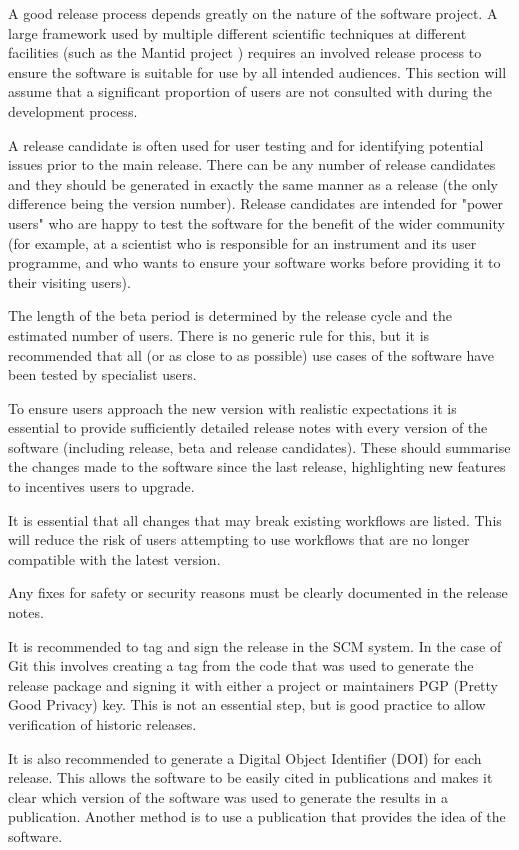 \documentclass[jnr]{iosart2x}
\begin{document}
\begin{itemzie}
A good release process depends greatly on the nature of the software project.
A large framework used by multiple different scientific techniques at different facilities (such as the Mantid project \cite{Manitd}) requires an involved release process to ensure the software is suitable for use by all intended audiences.
This section will assume that a significant proportion of users are not consulted with during the development process.

A release candidate is often used for user testing and for identifying potential issues prior to the main release.
There can be any number of release candidates and they should be generated in exactly the same manner as a release (the only difference being the version number).
Release candidates are intended for "power users" who are happy to test the software for the benefit of the wider community (for example, at a scientist who is responsible for an instrument and its user programme, and who wants to ensure your software works before providing it to their visiting users).

The length of the beta period is determined by the release cycle and the estimated number of users.
There is no generic rule for this, but it is recommended that all (or as close to as possible) use cases of the software have been tested by specialist users.

To ensure users approach the new version with realistic expectations it is essential to provide sufficiently detailed release notes with every version of the software (including release, beta and release candidates).
These should summarise the changes made to the software since the last release, highlighting new features to incentives users to upgrade.

It is essential that all changes that may break existing workflows are listed.
This will reduce the risk of users attempting to use workflows that are no longer compatible with the latest version.

Any fixes for safety or security reasons must be clearly documented in the release notes.

It is recommended to tag and sign the release in the SCM system. In the case of Git this involves creating a tag from the code that was used to generate the release package and signing it with either a project or maintainers PGP (Pretty Good Privacy) key.
This is not an essential step, but is good practice to allow verification of historic releases.

It is also recommended to generate a Digital Object Identifier (DOI) for each release.
This allows the software to be easily cited in publications and makes it clear which version of the software was used to generate the results in a publication.
Another method is to use a publication that provides the idea of the software.


\end{itemzie}
\end{document}
